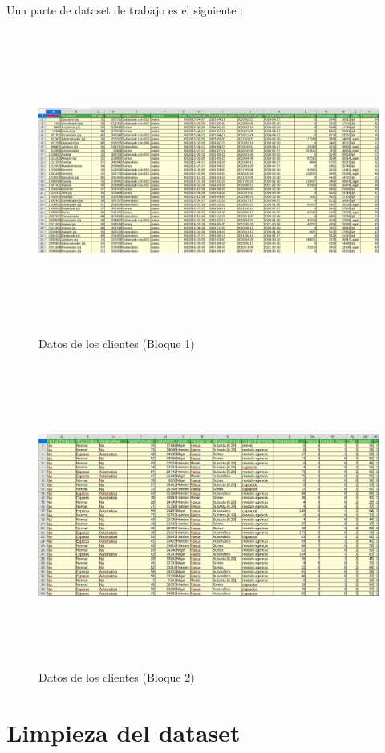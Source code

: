 Una parte de dataset de trabajo es el siguiente :

\begin{figure}[H]
    \centering
       \includegraphics[width=16cm, height=10cm ]{Imagenes/Datos_Clientes1.PNG }
      \caption{Datos de los clientes (Bloque 1)}
      \label{fig:clis1}
\end{figure}
\newpage
\begin{figure}[H]
    \centering
       \includegraphics[width=16cm, height=10cm ]{Imagenes/Datos_Clientes2.PNG }
      \caption{Datos de los clientes (Bloque 2)}
      \label{fig:clis2}
\end{figure}
 
\section{Limpieza del dataset}


